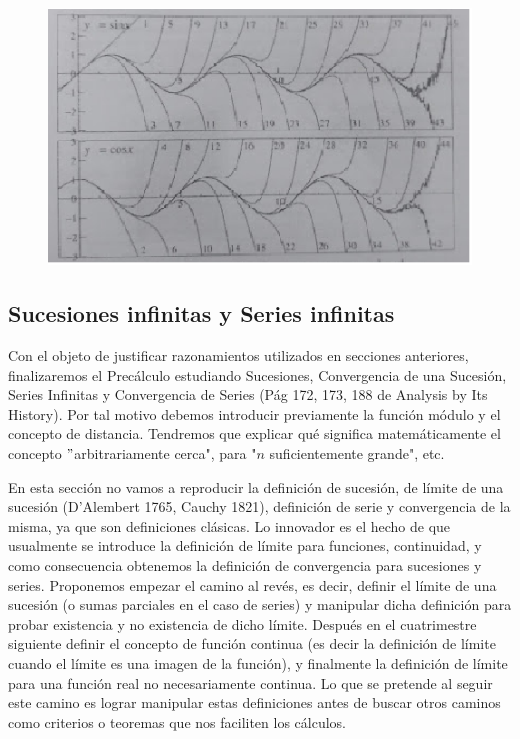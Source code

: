 \documentclass[a4paper,10pt,BCOR10mm,oneside,headsepline]{scrbook}
\begin{document}
 \begin{figure}[h!]
    \centering				                     	\includegraphics[width=0.60\linewidth]{graftrig.png}
\end{figure}
 

\newpage
\subsection{Sucesiones infinitas y Series infinitas} 

Con el objeto de justificar razonamientos utilizados en secciones anteriores, finalizaremos el Precálculo estudiando Sucesiones, Convergencia de una Sucesión, Series Infinitas y Convergencia de Series (Pág 172, 173, 188 de Analysis by Its History). Por tal motivo debemos introducir previamente la función módulo y el concepto de distancia. Tendremos que explicar qué significa matemáticamente el concepto $"$arbitrariamente cerca", para "$n$ suficientemente grande", etc.


En esta sección no vamos a reproducir la definición de sucesión, de límite de una sucesión (D'Alembert 1765, Cauchy 1821), definición de serie y convergencia de la misma, ya que son definiciones clásicas. Lo innovador es el hecho de que usualmente se introduce la definición de límite para funciones, continuidad, y como consecuencia obtenemos la definición de convergencia para sucesiones y series. Proponemos empezar el camino al revés, es decir, definir el límite de una sucesión (o sumas parciales en el caso de series) y manipular dicha definición para probar existencia y no existencia de dicho límite. Después en el cuatrimestre siguiente definir el concepto de función continua (es decir la definición de límite cuando el límite es una imagen de la función), y finalmente la definición de límite para una función real no necesariamente continua. Lo que se pretende al seguir este camino es lograr manipular estas definiciones antes de buscar otros caminos como criterios o teoremas que nos faciliten los cálculos.
\end{document}
